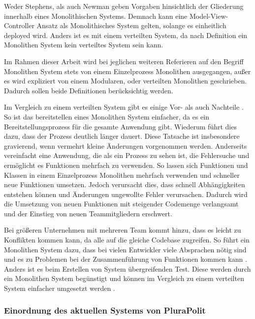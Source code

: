Weder Stephens, als auch Newman geben Vorgaben hinsichtlich der Gliederung innerhalb eines Monolithischen Systems. Demnach kann eine Model-View-Controller Ansatz als Monolithisches System gelten, solange es einheitlich deployed wird. Anders ist es mit einem verteilten System, da nach Definition ein Monolithen System kein verteiltes System sein kann. 

Im Rahmen dieser Arbeit wird bei jeglichen weiteren Referieren auf den Begriff Monolithen System stets von einem Einzelprozess Monolithen ausgegangen, außer es wird expliziert von einem Modularen, oder verteilten Monolithen geschrieben. Dadurch sollen beide Definitionen berücksichtig werden.

Im Vergleich zu einem verteilten System gibt es einige Vor- als auch Nachteile \parencite[vgl.][Kap. 2.2.4 und Kap. 2.2.5]{newman_monolith_2019}. So ist das bereitstellen eines Monolithen System einfacher, da es ein Bereitstellungsprozess für die gesamte Anwendung gibt. Wiederum führt dies dazu, dass der Prozess deutlich länger dauert. Diese Tatsache ist insbesondere gravierend, wenn vermehrt kleine Änderungen vorgenommen werden. Anderseits vereinfacht eine Anwendung, die als ein Prozess zu sehen ist, die Fehlersuche und ermöglicht es Funktionen mehrfach zu verwenden. So lassen sich Funktionen und Klassen in einem Einzelprozess Monolithen mehrfach verwenden und schneller neue Funktionen umsetzen. Jedoch verursacht dies, dass schnell Abhängigkeiten entstehen können und Änderungen ungewollte Fehler verursachen. Dadurch wird die Umsetzung von neuen Funktionen mit steigender Codemenge verlangsamt und der Einstieg von neuen Teammitgliedern erschwert.

Bei größeren Unternehmen mit mehreren Team kommt hinzu, dass es leicht zu Konflikten kommen kann, da alle auf die gleiche Codebase zugreifen. So führt ein Monolithen System dazu, dass bei vielen Entwickler viele Absprachen nötig sind und es zu Problemen bei der Zusammenführung von Funktionen kommen kann \parencite[vgl.][Kap. 2.2.4]{newman_monolith_2019}. Anders ist es beim Erstellen von System übergreifenden Test. Diese werden durch ein Monolithen System begünstigt und können im Vergleich zu einem verteilten System einfacher umgesetzt werden  \parencite[vgl.][Kap. 2.2.5]{newman_monolith_2019}.

\subsubsection{Einordnung des aktuellen Systems von PluraPolit}

